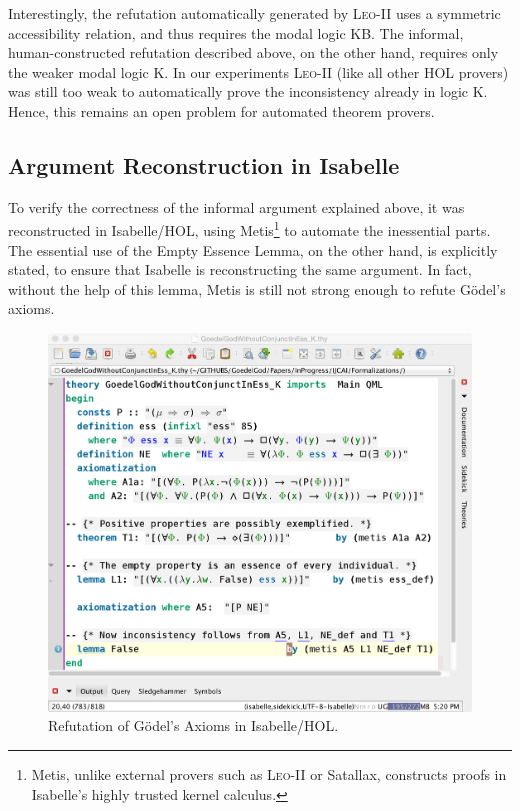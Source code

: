 \documentclass{article}
\begin{document}
Interestingly, the refutation automatically generated by
\textsc{Leo-II} uses a symmetric accessibility relation, and thus
requires the modal logic KB. The informal, human-constructed
refutation described above, on the other hand, requires only the
weaker modal logic K. In our experiments \textsc{Leo-II} (like all
other HOL provers) was still too weak to automatically prove the
inconsistency already in logic K. Hence, this remains an open problem for automated
theorem provers.


\subsection{Argument Reconstruction in Isabelle}  \label{sec:arg2}
To verify the correctness of the informal argument explained above, it
was reconstructed in Isabelle/HOL, using Metis\footnote{Metis, unlike
  external provers such as \textsc{Leo-II} or Satallax, 
  constructs proofs in Isabelle's highly trusted kernel calculus.} to automate the
inessential parts. The essential use of the Empty Essence Lemma, on
the other hand, is explicitly stated, to ensure that Isabelle is
reconstructing the same argument. In fact, without the help of this
lemma, Metis is still not strong enough to refute G\"odel's
axioms. 
\begin{figure}[t]
\centerline{\includegraphics[width=\columnwidth]{./Images/InconsistencyIsabelleK.png}}
\caption{Refutation of G\"odel's Axioms in Isabelle/HOL.} \label{InconsistencyIsabelleK}
\end{figure}
\end{document}
